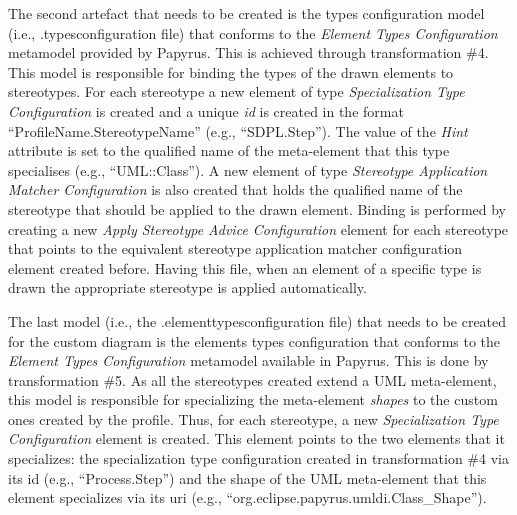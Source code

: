 The second artefact that needs to be created is the types configuration model (i.e., .typesconfiguration file) that conforms to the \textit{Element Types 
Configuration} metamodel provided by Papyrus. 
This is achieved through transformation \#4. This model is responsible for binding the types of the drawn elements to stereotypes. 
For each stereotype a new element of type \textit{Specialization Type Configuration} is created and a unique \textit{id} is created in the format ``ProfileName.StereotypeName'' (e.g., ``SDPL.Step''). 
The value of the \textit{Hint} attribute is set to the qualified name of the meta-element that this type specialises (e.g., ``UML::Class''). 
A new element of type \textit{Stereotype Application Matcher Configuration} is also created that holds the qualified name of the stereotype that should be applied to the drawn element. 
Binding is performed by creating a new \textit{Apply Stereotype Advice Configuration} element for each stereotype that points to the equivalent stereotype application matcher configuration element created before. 
Having this file, when an element of a specific type is drawn the appropriate stereotype is applied automatically. 

The last model (i.e., the .elementtypesconfiguration file) that needs to be created for the custom diagram is the elements types configuration that 
conforms to the \textit{Element Types Configuration} metamodel available in Papyrus. 
This is done by transformation \#5. As all the stereotypes created extend a UML meta-element, this model is responsible for specializing the meta-element \textit{shapes} to the custom ones created by the profile. 
Thus, for each stereotype, a new \textit{Specialization Type Configuration} element is created. 
This element points to the two elements that it specializes: the specialization type configuration created in transformation \#4 via its id (e.g., ``Process.Step'') and the shape of the UML meta-element that this element specializes via its uri (e.g., ``org.eclipse.papyrus.umldi.Class\_Shape'').

